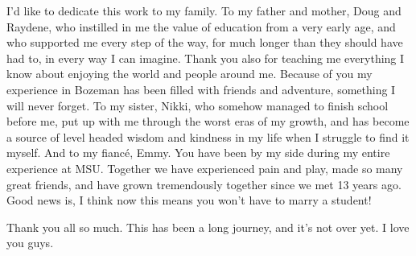 
I'd like to dedicate this work to my family.
To my father and mother, Doug and Raydene, who instilled in me the value of education from a very early age, and who supported me every step of the way, for much longer than they should have had to, in every way I can imagine.
Thank you also for teaching me everything I know about enjoying the world and people around me.
Because of you my experience in Bozeman has been filled with friends and adventure, something I will never forget.
To my sister, Nikki, who somehow managed to finish school before me, put up with me through the worst eras of my growth, and has become a source of level headed wisdom and kindness in my life when I struggle to find it myself.
And to my fianc\'e, Emmy. 
You have been by my side during my entire experience at MSU.
Together we have experienced pain and play, made so many great friends, and have grown tremendously together since we met 13 years ago.
Good news is, I think now this means you won't have to marry a student!

Thank you all so much.
This has been a long journey, and it's not over yet.
I love you guys.


